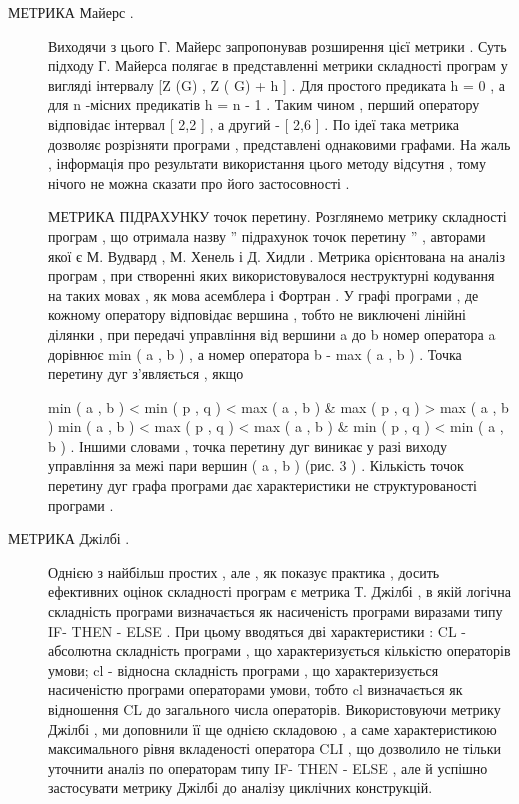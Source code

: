 \documentclass[oneside,final,14pt]{extreport}
\begin{document}
\begin{description}
\item[{МЕТРИКА Майерс .}] \leavevmode
Виходячи з цього Г. Майерс запропонував розширення цієї метрики . Суть підходу Г. Майерса полягає в представленні метрики складності програм у вигляді інтервалу {[}Z (G) , Z ( G) + h {]} . Для простого предиката h = 0 , а для n -місних предикатів h = n - 1 . Таким чином , перший оператору відповідає інтервал {[} 2,2 {]} , а другий - {[} 2,6 {]} .
По ідеї така метрика дозволяє розрізняти програми , представлені однаковими графами. На жаль , інформація про результати використання цього методу відсутня , тому нічого не можна сказати про його застосовності .

МЕТРИКА ПІДРАХУНКУ точок перетину.
Розглянемо метрику складності програм , що отримала назву '' підрахунок точок перетину '' , авторами якої є М. Вудвард , М. Хенель і Д. Хидли . Метрика орієнтована на аналіз програм , при створенні яких використовувалося неструктурні кодування на таких мовах , як мова асемблера і Фортран .
У графі програми , де кожному оператору відповідає вершина , тобто не виключені лінійні ділянки , при передачі управління від вершини a до b номер оператора a дорівнює min ( a , b ) , а номер оператора b - max ( a , b ) . Точка перетину дуг з'являється , якщо

min ( a , b ) \textless{} min ( p , q ) \textless{} max ( a , b ) \& max ( p , q ) \textgreater{} max ( a , b ) \textbar{}
min ( a , b ) \textless{} max ( p , q ) \textless{} max ( a , b ) \& min ( p , q ) \textless{} min ( a , b ) .
Іншими словами , точка перетину дуг виникає у разі виходу управління за межі пари вершин ( a , b ) (рис. 3 ) .
Кількість точок перетину дуг графа програми дає характеристики не структурованості програми .

\item[{МЕТРИКА Джілбі .}] \leavevmode
Однією з найбільш простих , але , як показує практика , досить ефективних оцінок складності програм є метрика Т. Джілбі , в якій логічна складність програми визначається як насиченість програми виразами типу IF- THEN - ELSE . При цьому вводяться дві характеристики : CL - абсолютна складність програми , що характеризується кількістю операторів умови; cl - відносна складність програми , що характеризується насиченістю програми операторами умови, тобто cl визначається як відношення CL до загального числа операторів.
Використовуючи метрику Джілбі , ми доповнили її ще однією складовою , а саме характеристикою максимального рівня вкладеності оператора CLI , що дозволило не тільки уточнити аналіз по операторам типу IF- THEN - ELSE , але й успішно застосувати метрику Джілбі до аналізу циклічних конструкцій.


\end{description}
\end{document}
